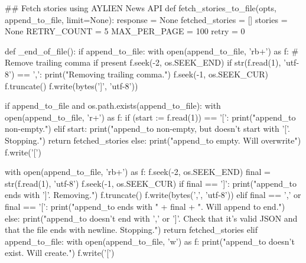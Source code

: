 \begin{pyin}
\## Fetch stories using AYLIEN News API
def fetch_stories_to_file(opts, append_to_file, limit=None):
    response = None
    fetched_stories = []
    stories = None
    RETRY_COUNT = 5
    MAX_PER_PAGE = 100
    retry = 0

    def _end_of_file():
        if append_to_file:
            with open(append_to_file, 'rb+') as f:
                # Remove trailing comma if present
                f.seek(-2, os.SEEK_END)
                if str(f.read(1), 'utf-8') == ',':
                    print("Removing trailing comma.")
                    f.seek(-1, os.SEEK_CUR)
                    f.truncate()
                    f.write(bytes('\n]\n', 'utf-8'))

    if append_to_file and os.path.exists(append_to_file):
        with open(append_to_file, 'r+') as f:
            if (start := f.read(1)) == '[':
                print("append_to non-empty.")
            elif start:
                print("append_to non-empty, but doesn't start with '['. Stopping.")
                return fetched_stories
            else:
                print("append_to empty. Will overwrite")
                f.write('[\n')

        with open(append_to_file, 'rb+') as f:
            f.seek(-2, os.SEEK_END)
            final = str(f.read(1), 'utf-8')
            f.seek(-1, os.SEEK_CUR)
            if final == ']':
                print("append_to ends with ']'. Removing.")
                f.truncate()
                f.write(bytes(',\n', 'utf-8'))
            elif final == ',' or final == '[':
                print("append_to ends with " + final + ". Will append to end.")
            else:
                print("append_to doesn't end with ',' or ']'. Check that it's valid JSON and that the file ends with newline. Stopping.")
                return fetched_stories
    elif append_to_file:
        with open(append_to_file, 'w') as f:
            print("append_to doesn't exist. Will create.")
            f.write('[\n')


\end{pyin}
